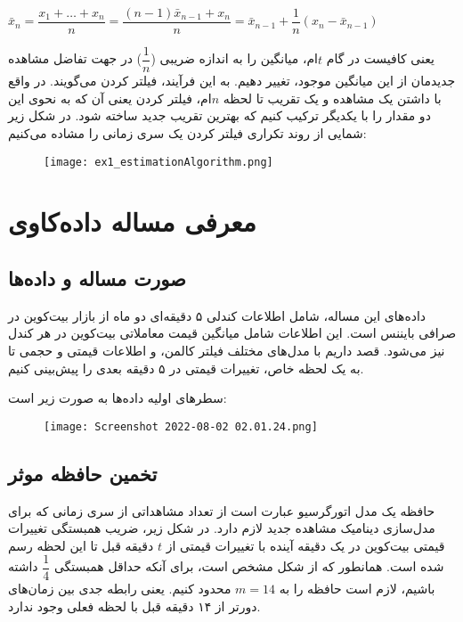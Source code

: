 \documentclass{scribe-cgenomics}
\begin{document}
\begin{center}
$
\bar{x}_n = \dfrac{x_1 + \dots + x_n}{n} = 
\dfrac{(n-1)\bar{x}_{n-1} + x_n}{n} = \bar{x}_{n-1} + \dfrac{1}{n}(x_n - \bar{x}_{n-1})
$
\end{center}

یعنی کافیست در گام
$t$ام،
میانگین را به اندازه ضریبی ($\dfrac{1}{n}$) در جهت تفاضل مشاهده جدیدمان از این میانگین موجود، تغییر دهیم. به این فرآیند، فیلتر کردن می‌گویند. در واقع با داشتن یک مشاهده و یک تقریب تا لحظه
$n$ام،
فیلتر کردن یعنی آن که به نحوی این دو مقدار را با یکدیگر ترکیب کنیم که بهترین تقریب جدید ساخته شود. در شکل زیر شمایی از روند تکراری فیلتر کردن یک سری زمانی را مشاده می‌کنیم:

\begin{figure}[h]
\texttt{[image: ex1\_estimationAlgorithm.png]}
\centering
\end{figure}




\section{معرفی مساله داده‌کاوی}
\subsection{صورت مساله و داده‌ها}
داده‌های این مساله، شامل اطلاعات کندلی ۵ دقیقه‌ای دو ماه از بازار بیت‌کوین در صرافی بایننس است. این اطلاعات شامل میانگین قیمت معاملاتی بیت‌کوین در هر کندل نیز می‌شود. قصد داریم با مدل‌های مختلف فیلتر کالمن، و اطلاعات قیمتی و حجمی تا به یک لحظه خاص، تغییرات قیمتی در ۵ دقیقه بعدی را پیش‌بینی کنیم.

سطرهای اولیه داده‌ها به صورت زیر است:

\begin{figure}[h]
\texttt{[image: Screenshot 2022-08-02 02.01.24.png]}
\centering
\end{figure}


\subsection{تخمین حافظه موثر}
حافظه یک مدل اتورگرسیو عبارت است از تعداد مشاهداتی از سری زمانی که برای مدل‌سازی دینامیک مشاهده جدید لازم دارد. در شکل زیر، ضریب همبستگی تغییرات قیمتی بیت‌کوین در یک دقیقه آینده با تغییرات قیمتی از
$t$
دقیقه قبل تا این لحظه رسم شده است. همانطور که از شکل مشخص است، برای آنکه حداقل همبستگی
$\dfrac{1}{4}$
داشته باشیم، لازم است حافظه را به
$m=14$
محدود کنیم. یعنی رابطه جدی بین زمان‌های دورتر از ۱۴ دقیقه قبل با لحظه فعلی وجود ندارد.
\end{document}
